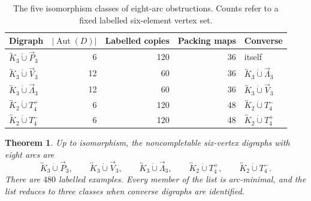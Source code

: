 \documentclass[10pt,a4paper]{amsart}
\newtheorem{theorem}{Theorem}
\newcommand{\Aut}{\operatorname{Aut}}
\newcommand{\bK}[1]{\overleftrightarrow{K}_{#1}}
\newcommand{\dL}{\overrightarrow{\Lambda}_{3}}
\newcommand{\dP}{\overrightarrow{P}_{3}}
\newcommand{\dV}{\overrightarrow{V}_{3}}
\newcommand{\dunion}{\mathbin{\dot\cup}}
\begin{document}
\begin{table}[ht]
\caption{The five isomorphism classes of eight-arc obstructions. Counts refer to a fixed labelled six-element vertex set.}
\label{tab:classes}
\centering
\small
\setlength{\tabcolsep}{4pt}
\begin{tabular}{@{}lrrrl@{}}
\toprule
Digraph & \(|\Aut(D)|\) & Labelled copies & Packing maps & Converse \\
\midrule
\(\bK{3}\dunion\dP\) & 6  & 120 & 36 & itself \\
\(\bK{3}\dunion\dV\) & 12 & 60  & 36 & \(\bK{3}\dunion\dL\) \\
\(\bK{3}\dunion\dL\) & 12 & 60  & 36 & \(\bK{3}\dunion\dV\) \\
\(\bK{2}\dunion T_4^+\) & 6 & 120 & 48 & \(\bK{2}\dunion T_4^-\) \\
\(\bK{2}\dunion T_4^-\) & 6 & 120 & 48 & \(\bK{2}\dunion T_4^+\) \\
\bottomrule
\end{tabular}
\end{table}

\begin{theorem}\label{thm:main-classification}
Up to isomorphism, the noncompletable six-vertex digraphs with eight arcs are
\[
\bK{3}\dunion\dP,
\qquad
\bK{3}\dunion\dV,
\qquad
\bK{3}\dunion\dL,
\qquad
\bK{2}\dunion T_4^+,
\qquad
\bK{2}\dunion T_4^-.
\]
There are \(480\) labelled examples. Every member of the list is arc-minimal, and the list reduces to three classes when converse digraphs are identified.
\end{theorem}
\end{document}
